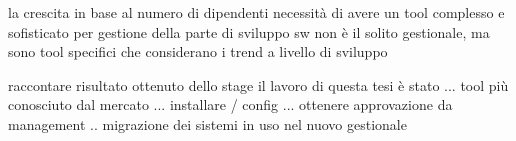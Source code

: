 
la crescita in base al numero di dipendenti necessità di avere un tool complesso e sofisticato per gestione della parte di sviluppo sw
non è il solito gestionale, ma sono tool specifici che considerano i trend a livello di sviluppo

raccontare risultato ottenuto dello stage
il lavoro di questa tesi è stato ... tool più conosciuto dal mercato ... installare / config ... 
ottenere approvazione da management .. migrazione dei sistemi in uso nel nuovo gestionale